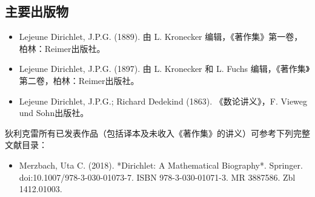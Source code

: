 \subsection{主要出版物}
\begin{itemize}
\item Lejeune Dirichlet, J.P.G. (1889). 由 L. Kronecker 编辑，《著作集》第一卷，柏林：Reimer出版社。
\item Lejeune Dirichlet, J.P.G. (1897). 由 L. Kronecker 和 L. Fuchs 编辑，《著作集》第二卷，柏林：Reimer出版社。
\item Lejeune Dirichlet, J.P.G.; Richard Dedekind (1863). 《数论讲义》，F. Vieweg und Sohn出版社。
\end{itemize}
狄利克雷所有已发表作品（包括译本及未收入《著作集》的讲义）可参考下列完整文献目录：
\begin{itemize}
\item  Merzbach, Uta C. (2018). *Dirichlet: A Mathematical Biography*. Springer. doi:10.1007/978-3-030-01073-7. ISBN 978-3-030-01071-3. MR 3887586. Zbl 1412.01003.
\end{itemize}
